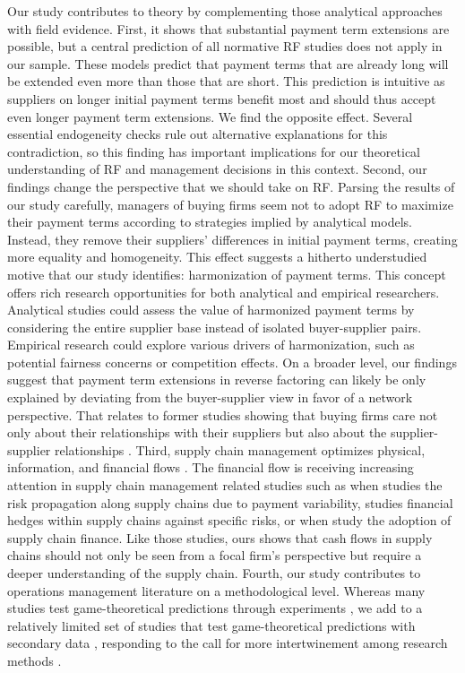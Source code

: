 \documentclass[A4,11pt]{article}
\renewcommand{\~}[1]{\tilde{#1}}
\renewcommand{\-}[1]{\overline{#1}}
\begin{document}
Our study contributes to theory by complementing those analytical approaches with field evidence. First, it shows that substantial payment term extensions are possible, but a central prediction of all normative RF studies does not apply in our sample. These models predict that payment terms that are already long will be extended even more than those that are short. This prediction is intuitive as suppliers on longer initial payment terms benefit most and should thus accept even longer payment term extensions. We find the opposite effect. Several essential endogeneity checks rule out alternative explanations for this contradiction, so this finding has important implications for our theoretical understanding of RF and management decisions in this context. Second, our findings change the perspective that we should take on RF. Parsing the results of our study carefully, managers of buying firms seem not to adopt RF to maximize their payment terms according to strategies implied by analytical models. Instead, they remove their suppliers' differences in initial payment terms, creating more equality and homogeneity. This effect suggests a hitherto understudied motive that our study identifies: harmonization of payment terms. This concept offers rich research opportunities for both analytical and empirical researchers. Analytical studies could assess the value of harmonized payment terms by considering the entire supplier base instead of isolated buyer-supplier pairs. Empirical research could explore various drivers of harmonization, such as potential fairness concerns or competition effects. On a broader level, our findings suggest that payment term extensions in reverse factoring can likely be only explained by deviating from the buyer-supplier view in favor of a network perspective. That relates to former studies showing that buying firms care not only about their relationships with their suppliers but also about the supplier-supplier relationships \citep{Wu2005, wu2010, Wilhelm2011}. Third, supply chain management optimizes physical, information, and financial flows \citep{Mentzer2001}. The financial flow is receiving increasing attention in supply chain management related studies such as when \citet{Serrano2018} studies the risk propagation along supply chains due to payment variability, \citet{Brusset2018} studies financial hedges within supply chains against specific risks, or when \citet{Wuttke2019} study the adoption of supply chain finance. Like those studies, ours shows that cash flows in supply chains should not only be seen from a focal firm's perspective but require a deeper understanding of the supply chain. Fourth, our study contributes to operations management literature on a methodological level. Whereas many studies test game-theoretical predictions through experiments \citep{Katok2009, Croson2013, donohue2016}, we add to a relatively limited set of studies that test game-theoretical predictions with secondary data \citep{Sluis2016, Tunca2017}, responding to the call for more intertwinement among research methods \citep{Singhal2012}.
\end{document}
